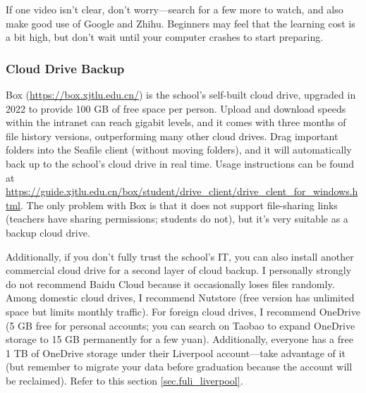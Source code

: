 If one video isn't clear, don't worry—search for a few more to watch, and also make good use of Google and Zhihu. Beginners may feel that the learning cost is a bit high, but don't wait until your computer crashes to start preparing.

\subsubsection{Cloud Drive Backup}
\label{sec.net_drive_backup}

Box (\url{https://box.xjtlu.edu.cn/}) is the school's self-built cloud drive, upgraded in 2022 to provide 100 GB of free space per person. Upload and download speeds within the intranet can reach gigabit levels, and it comes with three months of file history versions, outperforming many other cloud drives. Drag important folders into the Seafile client (without moving folders), and it will automatically back up to the school's cloud drive in real time. Usage instructions can be found at \url{https://guide.xjtlu.edu.cn/box/student/drive_client/drive_clent_for_windows.html}. The only problem with Box is that it does not support file-sharing links (teachers have sharing permissions; students do not), but it's very suitable as a backup cloud drive.

Additionally, if you don't fully trust the school's IT, you can also install another commercial cloud drive for a second layer of cloud backup. I personally strongly do not recommend Baidu Cloud because it occasionally loses files randomly. Among domestic cloud drives, I recommend Nutstore (free version has unlimited space but limits monthly traffic). For foreign cloud drives, I recommend OneDrive (5 GB free for personal accounts; you can search on Taobao to expand OneDrive storage to 15 GB permanently for a few yuan). Additionally, everyone has a free 1 TB of OneDrive storage under their Liverpool account—take advantage of it (but remember to migrate your data before graduation because the account will be reclaimed). Refer to this section \ref{sec.fuli_liverpool}.

